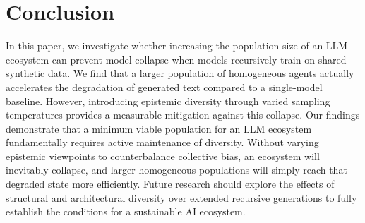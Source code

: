 \section{Conclusion}
\label{sec:conclusion}

In this paper, we investigate whether increasing the population size of an LLM ecosystem can prevent model collapse when models recursively train on shared synthetic data. We find that a larger population of homogeneous agents actually accelerates the degradation of generated text compared to a single-model baseline. However, introducing epistemic diversity through varied sampling temperatures provides a measurable mitigation against this collapse. Our findings demonstrate that a minimum viable population for an LLM ecosystem fundamentally requires active maintenance of diversity. Without varying epistemic viewpoints to counterbalance collective bias, an ecosystem will inevitably collapse, and larger homogeneous populations will simply reach that degraded state more efficiently. Future research should explore the effects of structural and architectural diversity over extended recursive generations to fully establish the conditions for a sustainable AI ecosystem.
